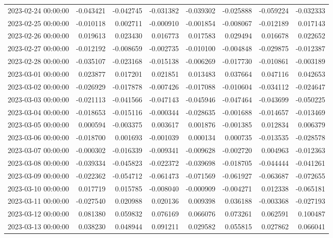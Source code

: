 \begin{tabular}{lrrrrrrr}
2023-02-24 00:00:00 & -0.043421 & -0.042745 & -0.031382 & -0.039302 & -0.025888 & -0.059224 & -0.032333 \\
2023-02-25 00:00:00 & -0.010118 & 0.002711 & -0.000910 & -0.001854 & -0.008067 & -0.012189 & 0.017143 \\
2023-02-26 00:00:00 & 0.019613 & 0.023430 & 0.016773 & 0.017583 & 0.029494 & 0.016678 & 0.022652 \\
2023-02-27 00:00:00 & -0.012192 & -0.008659 & -0.002735 & -0.010100 & -0.004848 & -0.029875 & -0.012387 \\
2023-02-28 00:00:00 & -0.035107 & -0.023168 & -0.015138 & -0.006269 & -0.017730 & -0.010861 & -0.003189 \\
2023-03-01 00:00:00 & 0.023877 & 0.017201 & 0.021851 & 0.013483 & 0.037664 & 0.047116 & 0.042653 \\
2023-03-02 00:00:00 & -0.026929 & -0.017878 & -0.007426 & -0.017088 & -0.010604 & -0.034112 & -0.024647 \\
2023-03-03 00:00:00 & -0.021113 & -0.041566 & -0.047143 & -0.045946 & -0.047464 & -0.043699 & -0.050225 \\
2023-03-04 00:00:00 & -0.018653 & -0.015116 & -0.000344 & -0.028635 & -0.001688 & -0.014657 & -0.013469 \\
2023-03-05 00:00:00 & 0.000594 & -0.003375 & 0.003617 & 0.001876 & -0.001385 & 0.012834 & 0.006379 \\
2023-03-06 00:00:00 & -0.018700 & 0.001693 & -0.001039 & 0.000134 & 0.000735 & -0.013535 & -0.028578 \\
2023-03-07 00:00:00 & -0.000302 & -0.016339 & -0.009341 & -0.009628 & -0.002720 & 0.004963 & -0.012363 \\
2023-03-08 00:00:00 & -0.039334 & -0.045823 & -0.022372 & -0.039698 & -0.018705 & -0.044444 & -0.041261 \\
2023-03-09 00:00:00 & -0.022362 & -0.054712 & -0.061473 & -0.071569 & -0.061927 & -0.063687 & -0.072655 \\
2023-03-10 00:00:00 & 0.017719 & 0.015785 & -0.008040 & -0.000909 & -0.004271 & 0.012338 & -0.065181 \\
2023-03-11 00:00:00 & -0.027540 & 0.020988 & 0.020136 & 0.009398 & 0.036188 & -0.003368 & -0.027193 \\
2023-03-12 00:00:00 & 0.081380 & 0.059832 & 0.076169 & 0.066076 & 0.073261 & 0.062591 & 0.100487 \\
2023-03-13 00:00:00 & 0.038230 & 0.048944 & 0.091211 & 0.029582 & 0.055815 & 0.027862 & 0.066041 \\

\end{tabular}
